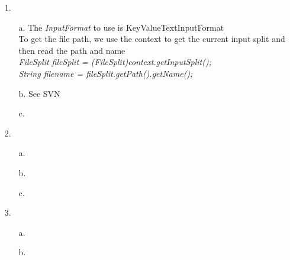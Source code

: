 \documentclass{article}
\begin{document}
\begin{itemize}
\item[1.] 
	\begin{itemize}
		\item[a.] The \textit{InputFormat} to use is KeyValueTextInputFormat\\
			To get the file path, we use the context to get the current input split and then read the path and name\\
			\textit{FileSplit fileSplit = (FileSplit)context.getInputSplit();}\\
			\textit{String filename = fileSplit.getPath().getName();}\\
		\item[b.] See SVN
		\item[c.]
	\end{itemize}

\pagebreak
\item[2.]
	\begin{itemize}
		\item[a.] 
		\item[b.] 
		\item[c.]
	\end{itemize}

\pagebreak
\item[3.]
	\begin{itemize}
		\item[a.] 
		\item[b.]
	\end{itemize}
	
\end{itemize}
\end{document}
